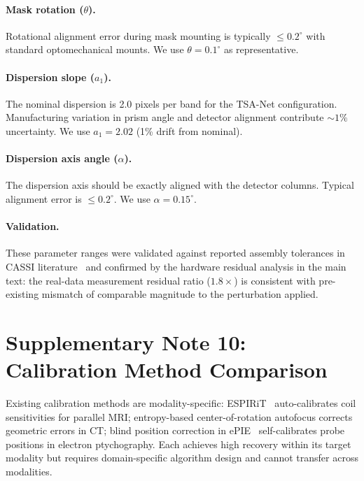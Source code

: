 \documentclass[11pt]{article}
\theoremstyle{definition}
\begin{document}
\paragraph{Mask rotation ($\theta$).}
Rotational alignment error during mask mounting is typically
$\leq 0.2^\circ$ with standard optomechanical mounts.  We use
$\theta = 0.1^\circ$ as representative.

\paragraph{Dispersion slope ($a_1$).}
The nominal dispersion is 2.0 pixels per band for the TSA-Net
configuration.  Manufacturing variation in prism angle and detector
alignment contribute $\sim 1\%$ uncertainty.  We use $a_1 = 2.02$
(1\% drift from nominal).

\paragraph{Dispersion axis angle ($\alpha$).}
The dispersion axis should be exactly aligned with the detector columns.
Typical alignment error is $\leq 0.2^\circ$.  We use
$\alpha = 0.15^\circ$.

\paragraph{Validation.}
These parameter ranges were validated against reported assembly
tolerances in CASSI literature~\cite{wagadarikar2008cassi} and confirmed
by the hardware residual analysis in the main text: the real-data
measurement residual ratio ($1.8\times$) is consistent with pre-existing
mismatch of comparable magnitude to the perturbation applied.


\newpage
\section{Supplementary Note 10: Calibration Method Comparison}
\label{sec:calibration_comparison}

Existing calibration methods are modality-specific: ESPIRiT~\cite{uecker2014espirit} auto-calibrates coil sensitivities for parallel MRI; entropy-based center-of-rotation autofocus corrects geometric errors in CT; blind position correction in ePIE~\cite{maiden2009ptychography} self-calibrates probe positions in electron ptychography. Each achieves high recovery within its target modality but requires domain-specific algorithm design and cannot transfer across modalities.
\end{document}
